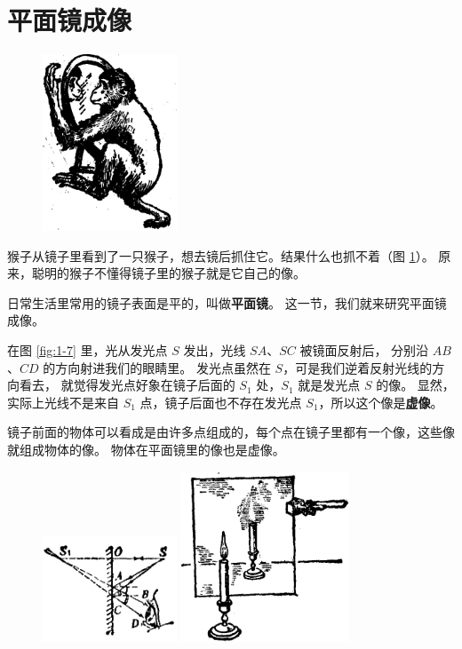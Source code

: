 \section{平面镜成像}\label{sec:1-3}

\begin{figure}
    \centering
    \includegraphics[width=4cm]{../pic/czwl2-ch1-6}
    \caption{}\label{fig:1-6}
\end{figure}


猴子从镜子里看到了一只猴子，想去镜后抓住它。结果什么也抓不着（图 \ref{fig:1-6}）。
原来，聪明的猴子不懂得镜子里的猴子就是它自己的像。

日常生活里常用的镜子表面是平的，叫做\textbf{平面镜}。
这一节，我们就来研究平面镜成像。


在图 \ref{fig:1-7} 里，光从发光点 $S$ 发出，光线 $SA$、$SC$ 被镜面反射后，
分别沿 $AB$、$CD$ 的方向射进我们的眼睛里。
发光点虽然在 $S$，可是我们逆着反射光线的方向看去，
就觉得发光点好象在镜子后面的 $S_1$ 处，$S_1$ 就是发光点 $S$ 的像。
显然，实际上光线不是来自 $S_1$ 点，镜子后面也不存在发光点 $S_1$，所以这个像是\textbf{虚像}。

镜子前面的物体可以看成是由许多点组成的，每个点在镜子里都有一个像，这些像就组成物体的像。
物体在平面镜里的像也是虚像。

\begin{figure}[htbp]
    \centering
    \begin{minipage}{7cm}
    \centering
    \includegraphics[width=4cm]{../pic/czwl2-ch1-7}
    \caption{}\label{fig:1-7}
    \end{minipage}
    \qquad
    \begin{minipage}{7cm}
    \centering
    \includegraphics[width=5cm]{../pic/czwl2-ch1-8}
    \caption{}\label{fig:1-8}
    \end{minipage}
\end{figure}



